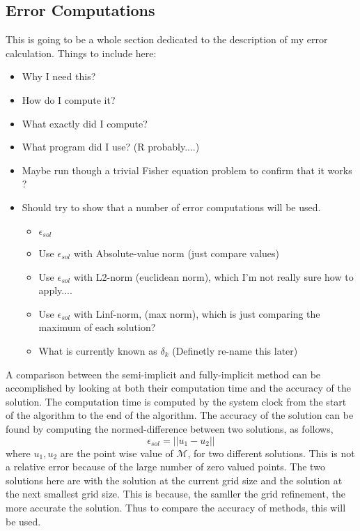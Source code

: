 \subsection{Error Computations}
This is going to be a whole section dedicated to the description of my error calculation. Things to include here:
\begin{itemize}
  \item Why I need this?
  \item How do I compute it?
  \item What exactly did I compute?
  \item What program did I use? (R probably....)
  \item Maybe run though a trivial Fisher equation problem to confirm that it works ?
  \item Should try to show that a number of error computations will be used.
    \begin{itemize}
      \item $\epsilon_{sol}$

      \item Use $\epsilon_{sol}$ with Absolute-value norm (just compare values)
      \item Use $\epsilon_{sol}$ with L2-norm (euclidean norm), which I'm not really sure how to apply....
      \item Use $\epsilon_{sol}$ with Linf-norm, (max norm), which is just comparing the maximum of each solution?
      \item What is currently known as $\delta_k$ (Definetly re-name this later)
    \end{itemize}
\end{itemize}

  A comparison between the semi-implicit and fully-implicit method can be accomplished by looking at both their computation time and the accuracy of the solution.
  The computation time is computed by the system clock from the start of the algorithm to the end of the algorithm. 
  The accuracy of the solution can be found by computing the normed-difference between two solutions, as follows,
  \begin{equation}
    \epsilon_{sol} = {||u_1 - u_2||}
  \end{equation}
  where $u_1, u_2$ are the point wise value of $\mathcal{M}$, for two different solutions.
  This is not a relative error because of the large number of zero valued points. 
  The two solutions here are with the solution at the current grid size and the solution at the next smallest grid size.
  This is because, the samller the grid refinement, the more accurate the solution. 
  Thus to compare the accuracy of methods, this will be used.

